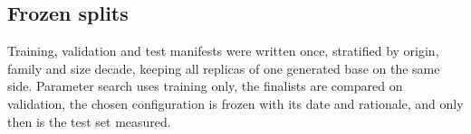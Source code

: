 \subsection{Frozen splits}

Training, validation and test manifests were written once, stratified by origin,
family and size decade, keeping all replicas of one generated base on the same
side. Parameter search uses training only, the finalists are compared on
validation, the chosen configuration is frozen with its date and rationale, and
only then is the test set measured.
